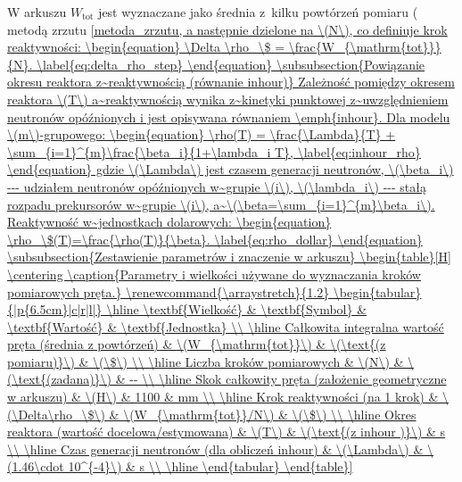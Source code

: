 W arkuszu \(W_{\mathrm{tot}}\) jest wyznaczane jako średnia z~kilku powtórzeń pomiaru ( metodą zrzutu \ref{metoda_zrzutu,
a następnie dzielone na \(N\), co definiuje krok reaktywności:
\begin{equation}
	\Delta \rho_\$ = \frac{W_{\mathrm{tot}}}{N}.
	\label{eq:delta_rho_step}
\end{equation}

\subsubsection{Powiązanie okresu reaktora z~reaktywnością (równanie inhour)}
Zależność pomiędzy okresem reaktora \(T\) a~reaktywnością wynika z~kinetyki punktowej z~uwzględnieniem
neutronów opóźnionych i jest opisywana równaniem \emph{inhour}. Dla modelu \(m\)-grupowego:
\begin{equation}
	\rho(T) = \frac{\Lambda}{T} + \sum_{i=1}^{m}\frac{\beta_i}{1+\lambda_i T},
	\label{eq:inhour_rho}
\end{equation}
gdzie \(\Lambda\) jest czasem generacji neutronów, \(\beta_i\) --- udziałem neutronów opóźnionych w~grupie \(i\),
\(\lambda_i\) --- stałą rozpadu prekursorów w~grupie \(i\), a~\(\beta=\sum_{i=1}^{m}\beta_i\).
Reaktywność w~jednostkach dolarowych:
\begin{equation}
	\rho_\$(T)=\frac{\rho(T)}{\beta}.
	\label{eq:rho_dollar}
\end{equation}




\subsubsection{Zestawienie parametrów i znaczenie w arkuszu}
\begin{table}[H]
	\centering
	\caption{Parametry i wielkości używane do wyznaczania kroków pomiarowych pręta.}
	\renewcommand{\arraystretch}{1.2}
	\begin{tabular}{|p{6.5cm}|c|r|l|}
		\hline
		\textbf{Wielkość} & \textbf{Symbol} & \textbf{Wartość} & \textbf{Jednostka} \\
		\hline
		Całkowita integralna wartość pręta (średnia z powtórzeń) & \(W_{\mathrm{tot}}\) & \(\text{(z pomiaru)}\) & \(\$\) \\
		\hline
		Liczba kroków pomiarowych & \(N\) & \(\text{(zadana)}\) & -- \\
		\hline
		Skok całkowity pręta (założenie geometryczne w arkuszu) & \(H\) & 1100 & mm \\
		\hline
		Krok reaktywności (na 1 krok) & \(\Delta\rho_\$\) & \(W_{\mathrm{tot}}/N\) & \(\$\) \\
		\hline
		Okres reaktora (wartość docelowa/estymowana) & \(T\) & \(\text{(z inhour )}\) & s \\
		\hline
		Czas generacji neutronów (dla obliczeń inhour) & \(\Lambda\) & \(1.46\cdot 10^{-4}\) & s \\
		\hline


\end{tabular}
\end{table}}
